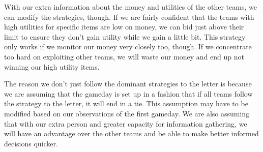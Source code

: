 \documentclass{article}
\begin{document}
With our extra information about the money and utilities of the other teams, we
can modify the strategies, though. If we are fairly confident that the teams
with high utilities for specific items are low on money, we can bid just above
their limit to ensure they don't gain utility while we gain a little bit. This
strategy only works if we monitor our money very closely too, though. If we
concentrate too hard on exploiting other teams, we will waste our money and
end up not winning our high utility items.

The reason we don't just follow the dominant strategies to the letter is
because we are assuming that the gameday is set up in a fashion that if all
teams follow the strategy to the letter, it will end in a tie. This assumption
may have to be modified based on our observations of the first gameday. We are
also assuming that with our extra person and greater capacity for information
gathering, we will have an advantage over the other teams and be able to make
better informed decisions quicker.
\end{document}
